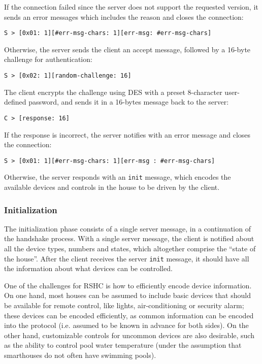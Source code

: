 \noindent
If the connection failed since the server does not support the requested version, it sends an error messages which includes the reason and closes the connection:

\begin{verbatim}
S > [0x01: 1][#err-msg-chars: 1][err-msg: #err-msg-chars]
\end{verbatim}

\noindent
Otherwise, the server sends the client an accept message, followed by a 16-byte challenge for authentication:

\begin{verbatim}
S > [0x02: 1][random-challenge: 16]
\end{verbatim}

\noindent
The client encrypts the challenge using DES with a preset 8-character user-defined password, and sends it in a 16-bytes message back to the server:

\begin{verbatim}
C > [response: 16]
\end{verbatim}

\noindent
If the response is incorrect, the server notifies with an error message and closes the connection:
\begin{verbatim}
S > [0x01: 1][#err-msg-chars: 1][err-msg : #err-msg-chars]
\end{verbatim}

\noindent
Otherwise, the server responds with an {\tt init} message, which encodes the available devices and controls in the house to be driven by the client.

\subsubsection{Initialization}
\label{sec:pdus:pdu:init}

The initialization phase consists of a single server message, in a continuation of the handshake process. With a single server message, the client is notified about all the device types, numbers and states, which altogether comprise the ``state of the house''. After the client receives the server {\tt init} message, it should have all the information about what devices can be controlled.

One of the challenges for RSHC is how to efficiently encode device information. On one hand, most houses can be assumed to include basic devices that should be available for remote control, like lights, air-conditioning or security alarm; these devices can be encoded efficiently, as common information can be encoded into the protocol (i.e. assumed to be known in advance for both sides). On the other hand, customizable controls for uncommon devices are also desirable, such as the ability to control pool water temperature (under the assumption that smarthouses do not often have swimming pools).

